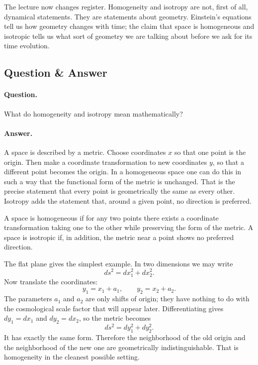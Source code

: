 The lecture now changes register. Homogeneity and isotropy are not, first of all, dynamical statements. They are statements about geometry. Einstein's equations tell us how geometry changes with time; the claim that space is homogeneous and isotropic tells us what sort of geometry we are talking about before we ask for its time evolution.

\subsection{Question \& Answer}

\paragraph{Question.} What do homogeneity and isotropy mean mathematically?

\paragraph{Answer.} A space is described by a metric. Choose coordinates \(x\) so that one point is the origin. Then make a coordinate transformation to new coordinates \(y\), so that a different point becomes the origin. In a homogeneous space one can do this in such a way that the functional form of the metric is unchanged. That is the precise statement that every point is geometrically the same as every other. Isotropy adds the statement that, around a given point, no direction is preferred.

\begin{definition}
A space is homogeneous if for any two points there exists a coordinate transformation taking one to the other while preserving the form of the metric. A space is isotropic if, in addition, the metric near a point shows no preferred direction.
\end{definition}

The flat plane gives the simplest example. In two dimensions we may write
\begin{equation}
ds^2 = dx_1^2 + dx_2^2 .
\end{equation}
Now translate the coordinates:
\begin{equation}
y_1 = x_1 + a_1,
\qquad
y_2 = x_2 + a_2 .
\end{equation}
The parameters \(a_1\) and \(a_2\) are only shifts of origin; they have nothing to do with the cosmological scale factor that will appear later. Differentiating gives \(dy_1=dx_1\) and \(dy_2=dx_2\), so the metric becomes
\begin{equation}
ds^2 = dy_1^2 + dy_2^2 .
\end{equation}
It has exactly the same form. Therefore the neighborhood of the old origin and the neighborhood of the new one are geometrically indistinguishable. That is homogeneity in the cleanest possible setting.

